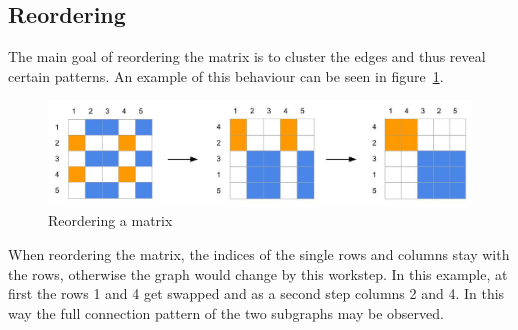 \subsection{Reordering}

The main goal of reordering the matrix is to cluster the edges and thus reveal certain patterns. An example of this behaviour can be seen in figure~\ref{fig:reorder}. 

\begin{figure}[h]
\includegraphics[width=\textwidth]{images/reorder}
\caption{Reordering a matrix\label{fig:reorder}}
\end{figure}


When reordering the matrix, the indices of the single rows and columns stay with the rows, otherwise the graph would change by this workstep. In this example, at first the rows 1 and 4 get swapped and as a second step columns 2 and 4. In this way the full connection pattern of the two subgraphs may be observed. 

